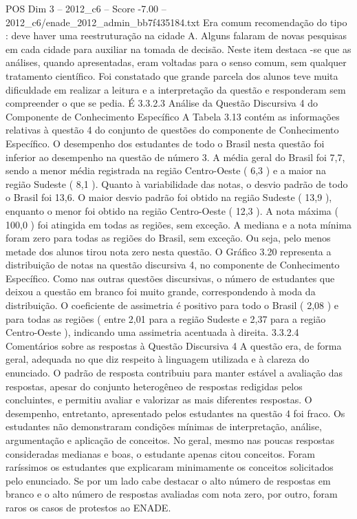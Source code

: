 \begin{textsample}{POS Dim 3 – 2012\_c6 – Score -7.00 – 2012\_c6/enade\_2012\_admin\_bb7f435184.txt}
Era comum recomendação do tipo : deve haver uma reestruturação na cidade A.
Alguns falaram de novas pesquisas em cada cidade para auxiliar na tomada de decisão.
Neste item destaca -se que as análises, quando apresentadas, eram voltadas para o senso comum, sem qualquer tratamento científico.
Foi constatado que grande parcela dos alunos teve muita dificuldade em realizar a leitura e a interpretação da questão e responderam sem compreender o que se pedia.
É 3.3.2.3 Análise da Questão Discursiva 4 do Componente de Conhecimento Específico A Tabela 3.13 contém as informações relativas à questão 4 do conjunto de questões do componente de Conhecimento Específico.
O desempenho dos estudantes de todo o Brasil nesta questão foi inferior ao desempenho na questão de número 3.
A média geral do Brasil foi 7,7, sendo a menor média registrada na região Centro-Oeste ( 6,3 ) e a maior na região Sudeste ( 8,1 ).
Quanto à variabilidade das notas, o desvio padrão de todo o Brasil foi 13,6.
O maior desvio padrão foi obtido na região Sudeste ( 13,9 ), enquanto o menor foi obtido na região Centro-Oeste ( 12,3 ).
A nota máxima ( 100,0 ) foi atingida em todas as regiões, sem exceção.
A mediana e a nota mínima foram zero para todas as regiões do Brasil, sem exceção.
Ou seja, pelo menos metade dos alunos tirou nota zero nesta questão.
O Gráfico 3.20 representa a distribuição de notas na questão discursiva 4, no componente de Conhecimento Específico.
Como nas outras questões discursivas, o número de estudantes que deixou a questão em branco foi muito grande, correspondendo à moda da distribuição.
O coeficiente de assimetria é positivo para todo o Brasil ( 2,08 ) e para todas as regiões ( entre 2,01 para a região Sudeste e 2,37 para a região Centro-Oeste ), indicando uma assimetria acentuada à direita. 3.3.2.4 Comentários sobre as respostas à Questão Discursiva 4 A questão era, de forma geral, adequada no que diz respeito à linguagem utilizada e à clareza do enunciado.
O padrão de resposta contribuiu para manter estável a avaliação das respostas, apesar do conjunto heterogêneo de respostas redigidas pelos concluintes, e permitiu avaliar e valorizar as mais diferentes respostas.
O desempenho, entretanto, apresentado pelos estudantes na questão 4 foi fraco.
Os estudantes não demonstraram condições mínimas de interpretação, análise, argumentação e aplicação de conceitos.
No geral, mesmo nas poucas respostas consideradas medianas e boas, o estudante apenas citou conceitos.
Foram raríssimos os estudantes que explicaram minimamente os conceitos solicitados pelo enunciado.
Se por um lado cabe destacar o alto número de respostas em branco e o alto número de respostas avaliadas com nota zero, por outro, foram raros os casos de protestos ao ENADE.

\end{textsample}

